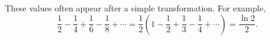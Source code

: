     \begin{strategy}
        These values often appear after a simple transformation. For example,
        \[
            \frac12-\frac14+\frac16-\frac18+\cdots
            =
            \frac12
            \left(
                1-\frac12+\frac13-\frac14+\cdots
            \right)
            =
            \frac{\ln 2}{2}.
        \]
    \end{strategy}
